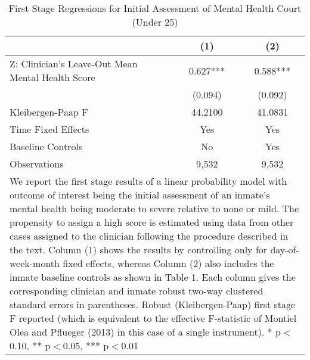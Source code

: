 \begin{table}[htbp]
\centering
\footnotesize
\def\sym#1{\ifmmode^{#1}\else\(^{#1}\)\fi}
\caption{First Stage Regressions for Initial Assessment of Mental Health Court (Under 25)}\label{tab:firststage}
\begin{tabular}{p{.35\linewidth}*{2}{c}}
\toprule
                    &\multicolumn{1}{c}{(1)}   &\multicolumn{1}{c}{(2)}   \\
\midrule
Z: Clinician's Leave-Out Mean Mental Health Score&       0.627***&       0.588***\\
                    &     (0.094)   &     (0.092)   \\
\midrule
Kleibergen-Paap F   &     44.2100   &     41.0831   \\
Time Fixed Effects  &         Yes   &         Yes   \\
Baseline Controls   &          No   &         Yes   \\
Observations        &       9,532   &       9,532   \\
\bottomrule
\multicolumn{3}{p{.7\textwidth}}{\tiny We report the first stage results of a linear probability model with outcome of interest being the initial assessment of an inmate's mental health being moderate to severe relative to none or mild. The propensity to assign a high score is estimated using data from other cases assigned to the clinician following the procedure described in the text. Column (1) shows the results by controlling only for day-of-week-month fixed effects, whereas Column (2) also includes the inmate baseline controls as shown in Table 1. Each column gives the corresponding clinician and inmate robust two-way clustered standard errors in parentheses. Robust (Kleibergen-Paap) first stage F reported (which is equivalent to the effective F-statistic of Montiel Olea and Pflueger (2013) in this case of a single instrument). * p$<$0.10, ** p$<$0.05, *** p$<$0.01}
\end{tabular}
\end{table}
